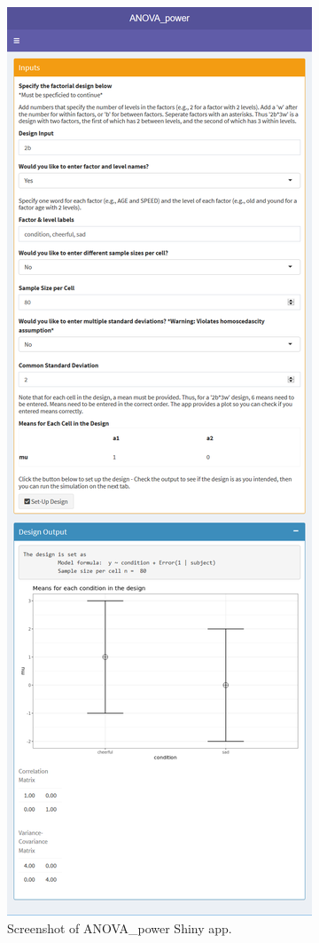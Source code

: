 \documentclass[
  ,jou,floatsintext]{apa6}
\begin{document}
\begin{figure}
\centering
\includegraphics{screenshots/anova_power.png}
\caption{Screenshot of ANOVA\_power Shiny app.}
\end{figure}
\end{document}
